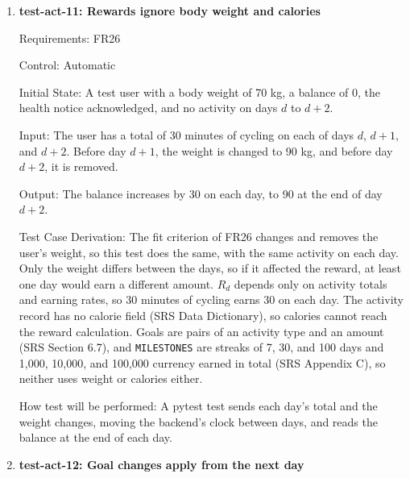 \documentclass[12pt, titlepage]{article}
\begin{document}
\begin{enumerate}
Output: Both balances increase by 10.

Test Case Derivation: At one unit per minute, a workout of between 10 and 11
minutes earns 10, since partial minutes are rounded down. FR15 requires the
same reward whether or not the user interacts with \progname{} during the
activity. The two testers do the workout together, so the only difference
between them is whether they open \progname{} during it.

How test will be performed: Each tester notes their balance before the
workout and compares it with the balance after opening \progname{}.

\item{\textbf{test-act-11: Rewards ignore body weight and calories}\\}

Requirements: FR26

Control: Automatic

Initial State: A test user with a body weight of 70 kg, a balance of 0, the
health notice acknowledged, and no activity on days $d$ to $d+2$.

Input: The user has a total of 30 minutes of cycling on each of days $d$,
$d+1$, and $d+2$. Before day $d+1$, the weight is changed to 90 kg, and before
day $d+2$, it is removed.

Output: The balance increases by 30 on each day, to 90 at the end of day
$d+2$.

Test Case Derivation: The fit criterion of FR26 changes and removes the
user's weight, so this test does the same, with the same activity on each day.
Only the weight differs between the days, so if it affected the reward, at
least one day would earn a different amount. $R_d$ depends only on activity
totals and earning rates, so 30 minutes of cycling earns 30 on each day. The
activity record has no calorie field (SRS Data Dictionary), so calories cannot
reach the reward calculation. Goals are pairs of an activity type and an
amount (SRS Section 6.7), and \texttt{MILESTONES} are streaks of 7, 30, and
100 days and 1,000, 10,000, and 100,000 currency earned in total (SRS Appendix
C), so neither uses weight or calories either.

How test will be performed: A pytest test sends each day's total and the
weight changes, moving the backend's clock between days, and reads the balance
at the end of each day.

\item{\textbf{test-act-12: Goal changes apply from the next day}\\}


\end{enumerate}
\end{document}
